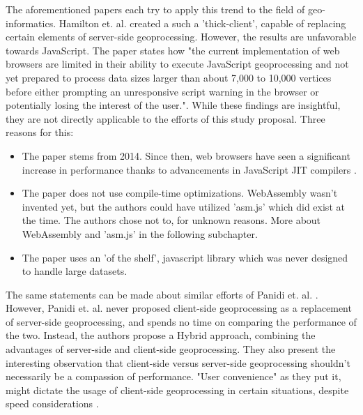 The aforementioned papers each try to apply this trend to the field of geo-informatics. \cite{hamilton_client-side_2014} Hamilton et. al. created a such a 'thick-client', capable of replacing certain elements of server-side geoprocessing. However, the results are unfavorable towards JavaScript. The paper states how "the current implementation of web browsers are limited in their ability to execute JavaScript geoprocessing and not yet prepared to process data sizes larger than about 7,000 to 10,000 vertices before either prompting an unresponsive script warning in the browser or potentially losing the interest of the user.". While these findings are insightful, they are not directly applicable to the efforts of this study proposal. Three reasons for this:

\begin{itemize}
  \item The paper stems from 2014. Since then, web browsers have seen a significant increase in performance thanks to advancements in JavaScript JIT compilers \cite{haas_bringing_2017, kulawiak_analysis_2019}. 
  \item The paper does not use compile-time optimizations. WebAssembly wasn't invented yet, but the authors could have utilized 'asm.js' \cite{mozilla_asmjs_2013} which did exist at the time. The authors chose not to, for unknown reasons. More about WebAssembly and 'asm.js' in the following subchapter. 
  \item The paper uses an 'of the shelf', javascript library which was never designed to handle large datasets.
\end{itemize}

The same statements can be made about similar efforts of Panidi et. al. \cite{panidi_hybrid_2015}. However, Panidi et. al. never proposed client-side geoprocessing as a replacement of server-side geoprocessing, and spends no time on comparing the performance of the two. Instead, the authors propose a Hybrid approach, combining the advantages of server-side and client-side geoprocessing. They also present the interesting observation that client-side versus server-side geoprocessing shouldn't necessarily be a compassion of performance. "User convenience" as they put it, might dictate the usage of client-side geoprocessing in certain situations, despite speed considerations \cite{panidi_hybrid_2015}. 


